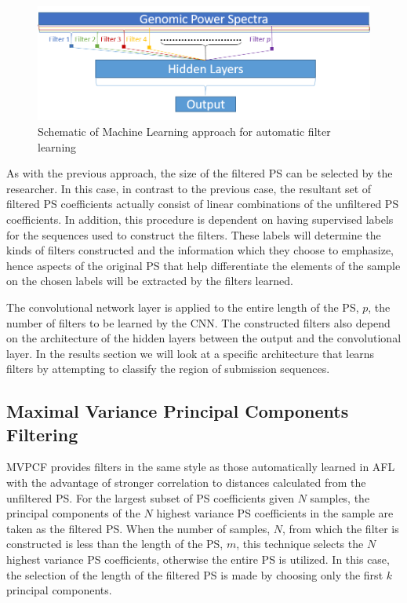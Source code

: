 \documentclass[10pt,conference]{IEEEtran}
\begin{document}
\begin{figure}[h!]
\centering
\caption{Schematic of Machine Learning approach for automatic filter learning \label{fig:mlschem} }
\includegraphics[scale=0.55]{Images/Files/afl.png}
\end{figure}

As with the previous approach, the size of the filtered PS can be selected by the researcher.
In this case, in contrast to the previous case, the resultant set of filtered PS coefficients actually consist of 
linear combinations of the unfiltered PS coefficients.  
In addition, this procedure is dependent on having supervised labels for the sequences used to construct 
the filters.  
These labels will determine the kinds of filters constructed and the information which they choose to 
emphasize, hence aspects of the original PS that help differentiate the elements of the 
sample on the chosen labels will be extracted by the filters learned.  

The convolutional network layer is applied to the entire length of the PS,  $p$, the number of filters to be learned by the 
CNN.  
The constructed filters also depend on the architecture of the hidden layers between the output 
and the convolutional layer.  
In the results section we will look at a specific architecture that learns filters by attempting to classify the 
region of submission sequences. 

\subsection{Maximal Variance Principal Components Filtering}

\noindent MVPCF provides filters in the same style as those automatically learned in AFL with the advantage of stronger correlation to distances calculated from the unfiltered PS.
For the largest subset of PS coefficients given $N$ samples, the principal components of the $N$ highest variance PS coefficients in the sample are taken as the filtered PS. 
When the number of samples, $N$, from which the filter is constructed is less than the length of the PS, $m$, 
this technique selects the $N$ highest variance PS coefficients, otherwise the entire PS is utilized. 
In this case, the selection of the length of the filtered PS is made by choosing only the first $k$ principal 
components. 
\end{document}
